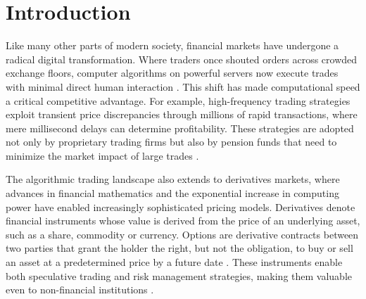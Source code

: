 \documentclass[english,12pt,a4paper,pdftex,sci,utf8]{aaltothesis}
\begin{document}
\newpage



\thesistableofcontents

\cleardoublepage
\storeinipagenumber
{}
\setcounter{page}{1}



\section{Introduction}
\thispagestyle{empty}
Like many other parts of modern society, financial markets have undergone a radical digital transformation. Where traders once shouted orders across crowded exchange floors, computer algorithms on powerful servers now execute trades with minimal direct human interaction \cite{mcgowan2010rise, mackenzie2018material}. This shift has made computational speed a critical competitive advantage. For example, high-frequency trading strategies exploit transient price discrepancies through millions of rapid transactions, where mere millisecond delays can determine profitability. These strategies are adopted not only by proprietary trading firms but also by pension funds that need to minimize the market impact of large trades \cite{mcgowan2010rise}.

The algorithmic trading landscape also extends to derivatives markets, where advances in financial mathematics \cite{merton1994influence} and the exponential increase in computing power \cite{nordhaus2007two} have enabled increasingly sophisticated pricing models. Derivatives denote financial instruments whose value is derived from the price of an underlying asset, such as a share, commodity or currency. Options are derivative contracts between two parties that grant the holder the right, but not the obligation, to buy or sell an asset at a predetermined price by a future date \cite{hull2018}. These instruments enable both speculative trading and risk management strategies, making them valuable even to non-financial institutions \cite{bartram2009international}.
\end{document}

